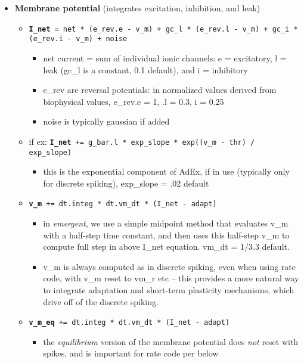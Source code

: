 \begin{itemize}
\item {\bf Membrane potential} (integrates excitation, inhibition, and leak)
  \begin{itemize}
  \item {\tt {\bf I\_net} = net * (e\_rev.e - v\_m) + gc\_l * (e\_rev.l - v\_m) + gc\_i * (e\_rev.i - v\_m) + noise}
    \begin{itemize}
    \item net current = sum of individual ionic channels: e = excitatory, l = leak (gc\_l is a constant, 0.1 default), and i = inhibitory
    \item e\_rev are reversal potentials: in normalized values derived from biophysical values, e\_rev.e = 1, .l = 0.3, i = 0.25
    \item noise is typically gaussian if added
    \end{itemize}
  \item if ex: {\tt {\bf I\_net} += g\_bar.l * exp\_slope * exp((v\_m - thr) / exp\_slope)}
    \begin{itemize}
    \item this is the exponential component of AdEx, if in use (typically only for discrete spiking), exp\_slope = .02 default
    \end{itemize}
  \item {\tt {\bf v\_m} += dt.integ * dt.vm\_dt * (I\_net - adapt)}
    \begin{itemize}
    \item in {\em emergent}, we use a simple midpoint method that evaluates v\_m with a half-step time constant, and then uses this half-step v\_m to compute full step in above I\_net equation. vm\_dt = 1/3.3 default.
    \item v\_m is always computed as in discrete spiking, even when using rate code, with v\_m reset to vm\_r etc -- this provides a more natural way to integrate adaptation and short-term plasticity mechanisms, which drive off of the discrete spiking.
    \end{itemize}
  \item {\tt {\bf v\_m\_eq} +=  dt.integ * dt.vm\_dt * (I\_net - adapt)}
    \begin{itemize}
    \item the {\em equilibrium} version of the membrane potential does {\em not} reset with spikes, and is important for rate code per below
    \end{itemize}
  \end{itemize}


\end{itemize}
